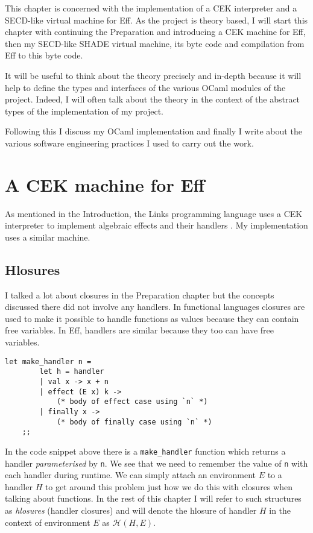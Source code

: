 \documentclass[class=article, crop=false]{standalone}
\begin{document}
This chapter is concerned with the implementation of a CEK interpreter and
a SECD-like virtual machine for Eff. As the project is theory based, I will start this chapter
with continuing the Preparation and introducing a CEK machine for Eff, then my SECD-like
SHADE virtual machine, its byte code and compilation from Eff to this byte code.

It will be useful to think about the theory precisely and in-depth because it will
help to define the types and interfaces of the various OCaml modules of the project.
Indeed, I will often talk about the theory in the context of the abstract types
of the implementation of my project.

Following this I discuss my OCaml implementation and finally I write about the various 
software engineering practices I used to carry out the work.

\section{A CEK machine for Eff}

As mentioned in the Introduction, the Links programming language uses a CEK interpreter
to implement algebraic effects and their handlers \cite{hillerstrom2016compilation}.
My implementation uses a similar machine.

\subsection{Hlosures}

I talked a lot about closures in the Preparation chapter but the concepts discussed there
did not involve any handlers. In functional languages closures are used to make it possible
to handle functions as values because they can contain free variables. In Eff, handlers are
similar because they too can have free variables.

\begin{lstlisting}[language=efflang]
    let make_handler n =
        let h = handler
        | val x -> x + n
        | effect (E x) k ->
            (* body of effect case using `n` *)
        | finally x ->
            (* body of finally case using `n` *)
    ;;
\end{lstlisting}

In the code snippet above there is a \verb|make_handler| function which returns a handler
\emph{parameterised} by \verb|n|. We see that we need to remember the value of \verb|n|
with each handler during runtime. We can simply attach an environment $E$ to a handler $H$ to
get around this problem just how we do this with closures when talking about functions.
In the rest of this chapter I will refer to such structures as \emph{hlosures} (handler closures)
and will denote the hlosure of handler $H$ in the context of environment $E$ as $\mathcal{H}(H, E)$.
\end{document}
